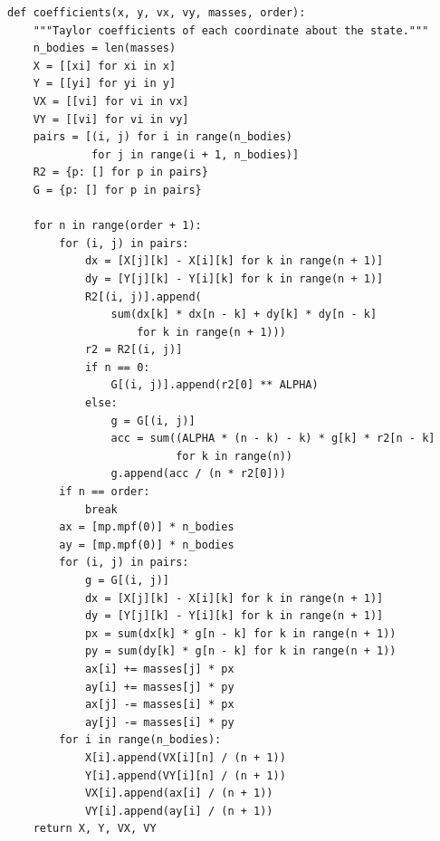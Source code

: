 \begin{verbatim}
def coefficients(x, y, vx, vy, masses, order):
    """Taylor coefficients of each coordinate about the state."""
    n_bodies = len(masses)
    X = [[xi] for xi in x]
    Y = [[yi] for yi in y]
    VX = [[vi] for vi in vx]
    VY = [[vi] for vi in vy]
    pairs = [(i, j) for i in range(n_bodies)
             for j in range(i + 1, n_bodies)]
    R2 = {p: [] for p in pairs}
    G = {p: [] for p in pairs}

    for n in range(order + 1):
        for (i, j) in pairs:
            dx = [X[j][k] - X[i][k] for k in range(n + 1)]
            dy = [Y[j][k] - Y[i][k] for k in range(n + 1)]
            R2[(i, j)].append(
                sum(dx[k] * dx[n - k] + dy[k] * dy[n - k]
                    for k in range(n + 1)))
            r2 = R2[(i, j)]
            if n == 0:
                G[(i, j)].append(r2[0] ** ALPHA)
            else:
                g = G[(i, j)]
                acc = sum((ALPHA * (n - k) - k) * g[k] * r2[n - k]
                          for k in range(n))
                g.append(acc / (n * r2[0]))
        if n == order:
            break
        ax = [mp.mpf(0)] * n_bodies
        ay = [mp.mpf(0)] * n_bodies
        for (i, j) in pairs:
            g = G[(i, j)]
            dx = [X[j][k] - X[i][k] for k in range(n + 1)]
            dy = [Y[j][k] - Y[i][k] for k in range(n + 1)]
            px = sum(dx[k] * g[n - k] for k in range(n + 1))
            py = sum(dy[k] * g[n - k] for k in range(n + 1))
            ax[i] += masses[j] * px
            ay[i] += masses[j] * py
            ax[j] -= masses[i] * px
            ay[j] -= masses[i] * py
        for i in range(n_bodies):
            X[i].append(VX[i][n] / (n + 1))
            Y[i].append(VY[i][n] / (n + 1))
            VX[i].append(ax[i] / (n + 1))
            VY[i].append(ay[i] / (n + 1))
    return X, Y, VX, VY
\end{verbatim}
